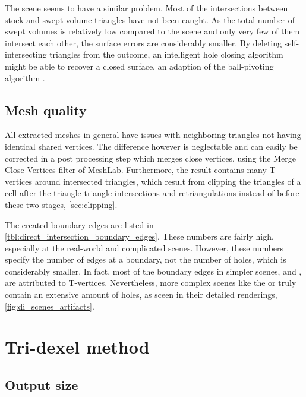 The \turbine scene seems to have a similar problem.
Most of the intersections between stock and swept volume triangles have not been caught.
As the total number of swept volumes is relatively low compared to the \impeller scene and only very few of them intersect each other, the surface errors are considerably smaller.
By deleting self-intersecting triangles from the outcome, an intelligent hole closing algorithm might be able to recover a closed surface, \eg an adaption of the ball-pivoting algorithm \cite{bpa}.


\subsection{Mesh quality}

All extracted meshes in general have issues with neighboring triangles not having identical shared vertices.
The difference however is neglectable and can easily be corrected in a post processing step which merges close vertices, \eg using the Merge Close Vertices filter of MeshLab.
Furthermore, the result contains many T-vertices around intersected triangles, which result from clipping the triangles of a cell after the triangle-triangle intersections and retriangulations instead of before these two stages, \cf \cref{sec:clipping}.

The created boundary edges are listed in \cref{tbl:direct_intersection_boundary_edges}.
These numbers are fairly high, especially at the real-world and complicated scenes.
However, these numbers specify the number of edges at a boundary, not the number of holes, which is considerably smaller.
In fact, most of the boundary edges in simpler scenes, \eg \cylinders and \cylinderhead, are attributed to T-vertices.
Nevertheless, more complex scenes like the \impeller or \turbine truly contain an extensive amount of holes, as sceen in their detailed renderings, \cf \cref{fig:di_scenes_artifacts}.


\section{Tri-dexel method}
\label{sec:tri_dexel_discussion}


\subsection {Output size}
\label{sec:tri_dexel_output_size}


